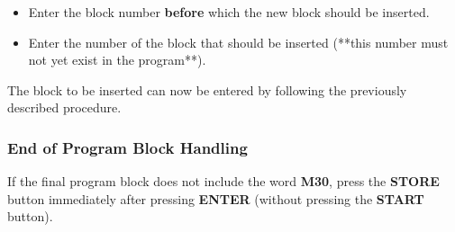 \vspace{.5cm}

\begin{itemize}
    \item Enter the block number \textbf{before} which the new block should be inserted.
\end{itemize}

\begin{itemize}
\end{itemize}

\vspace{.5cm}

\begin{itemize}
\end{itemize}

\vspace{.5cm}

\begin{itemize}
\end{itemize}

\vspace{.5cm}

\begin{itemize}
    \item Enter the number of the block that should be inserted (**this number must not yet exist in the program**).
\end{itemize}

\begin{itemize}
\end{itemize}

\vspace{.5cm}

The block to be inserted can now be entered by following the previously described procedure.

\newpage

\subsubsection*{End of Program Block Handling}

If the final program block does not include the word \textbf{M30}, press the \textbf{STORE} button immediately after pressing \textbf{ENTER} (without pressing the \textbf{START} button).

